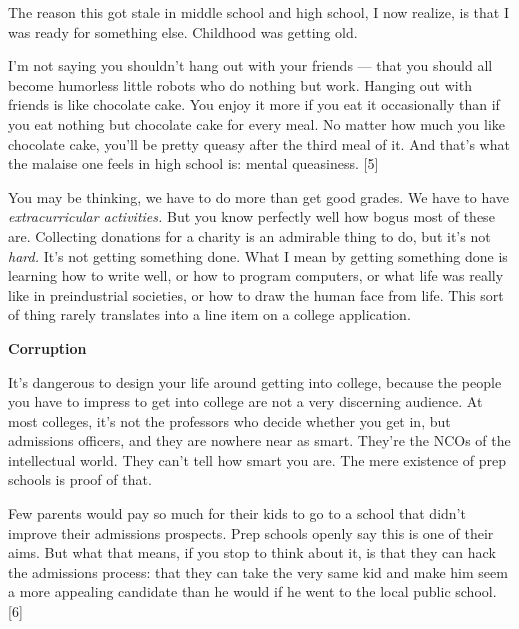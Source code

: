 The reason
                  this got stale in middle school and high school, I now
                  realize, is that I was ready for something else. Childhood was
                  getting old.

I'm not saying you shouldn't hang out
                  with your friends --- that you should all become humorless
                  little robots who do nothing but work. Hanging out with
                  friends is like chocolate cake. You enjoy it more if you eat
                  it occasionally than if you eat nothing but chocolate cake for
                  every meal. No matter how much you like chocolate cake, you'll
                  be pretty queasy after the third meal of it. And that's what
                  the malaise one feels in high school is: mental queasiness.
                  [5]

You may be thinking, we have to do more than
                  get good grades. We have to have
                  \emph{extracurricular activities.} But you know perfectly well
                  how bogus most of these are. Collecting donations for a
                  charity is an admirable thing to do, but it's not
                  \emph{hard.} It's not getting something done. What I mean by
                  getting something done is learning how to write well, or how
                  to program computers, or what life was really like in
                  preindustrial societies, or how to draw the human face from
                  life. This sort of thing rarely translates into a line item on
                  a college application.

\textbf{Corruption}

It's dangerous to design your life around getting
                  into college, because the people you have to impress to get
                  into college are not a very discerning audience. At most
                  colleges, it's not the professors who decide whether you get
                  in, but admissions officers, and they are nowhere near as
                  smart. They're the NCOs of the intellectual world. They can't
                  tell how smart you are. The mere existence of prep schools is
                  proof of that.

Few parents would pay so much for
                  their kids to go to a school that didn't improve their
                  admissions prospects. Prep schools openly say this is one of
                  their aims. But what that means, if you stop to think about
                  it, is that they can hack the admissions process: that they
                  can take the very same kid and make him seem a more appealing
                  candidate than he would if he went to the local public school.
                  [6]

